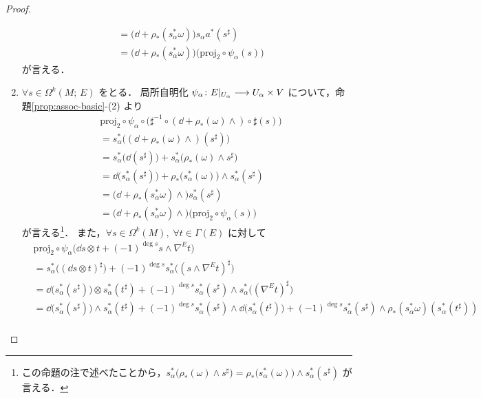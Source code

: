 \documentclass[TQFT_main]{subfiles}
\begin{document}
\begin{proof}
\begin{enumerate}
\begin{align}
            &= \bigl( \dd + \rho_* (s_\alpha^* \omega) \bigr) s_\alpha a^*(s^\sharp) \\
            &= \bigl( \dd + \rho_* (s_\alpha^* \omega) \bigr) \bigl( \mathrm{proj}_2 \circ \psi_\alpha (s) \bigr)
        \end{align}
        が言える．
        \item $\forall s \in \Omega^k(M;\, E)$ をとる．
        局所自明化 $\psi_\alpha \colon E|_{U_\alpha} \longrightarrow U_\alpha \times V$ について，命題\ref{prop:assoc-basic}-(2) より
        \begin{align}
            &\mathrm{proj}_2 \circ \psi_\alpha \circ \bigl( \sharp^{-1} \circ (\dd + \rho_*(\omega) \wedge) \circ \sharp(s) \bigr) \\
            &= s_\alpha^* \bigl( (\dd + \rho_*(\omega) \wedge)(s^\sharp)\bigr) \\
            &= s_\alpha^* \bigl( \dd(s^\sharp) \bigr) + s_\alpha^* \bigl( \rho_*(\omega) \wedge s^\sharp \bigr) \\
            &= \dd\bigl( s_\alpha^*(s^\sharp) \bigr) + \rho_* \bigl( s_\alpha^*(\omega) \bigr) \wedge s_\alpha^*(s^\sharp)  \\
            &= \bigl( \dd + \rho_*(s_\alpha^*\omega) \wedge \bigr)  s_\alpha^*(s^\sharp) \\
            &= \bigl( \dd + \rho_*(s_\alpha^*\omega) \wedge \bigr)  \bigl(\mathrm{proj}_2 \circ \psi_\alpha(s) \bigr) 
        \end{align}
        が言える\footnote{この命題の注で述べたことから，$s_\alpha^* \bigl( \rho_*(\omega) \wedge s^\sharp \bigr) =  \rho_* \bigl( s_\alpha^*(\omega) \bigr) \wedge s_\alpha^*(s^\sharp)$ が言える．}．
        また，$\forall s \in \Omega^k(M),\; \forall t \in \Gamma(E)$ に対して
        \begin{align}
            &\mathrm{proj}_2 \circ \psi_\alpha \bigl( \dd{s} \otimes t + (-1)^{\deg s} s \wedge \nabla^E t \bigr) \\
            &= s_\alpha^* \bigl( (\dd{s} \otimes t)^\sharp \bigr) + (-1)^{\deg s} s_\alpha^*\bigl( (s \wedge \nabla^E t)^\sharp\bigr) \\
            &= \dd \bigl( s_\alpha^* (s^\sharp) \bigr) \otimes s_\alpha^* (t^\sharp)  + (-1)^{\deg s}s_\alpha^* (s^\sharp) \wedge s_\alpha^* \bigl( (\nabla^E t)^\sharp \bigr) \\
            &= \dd \bigl( s_\alpha^* (s^\sharp) \bigr) \wedge s_\alpha^* (t^\sharp)  + (-1)^{\deg s} s_\alpha^* (s^\sharp) \wedge \dd \bigl( s_\alpha^*(t^\sharp) \bigr) + (-1)^{\deg s} s_\alpha^* (s^\sharp)  \wedge \rho_* (s_\alpha^* \omega)(s_\alpha^*(t^\sharp)) \\

\end{align}
\end{enumerate}
\end{proof}
\end{document}
